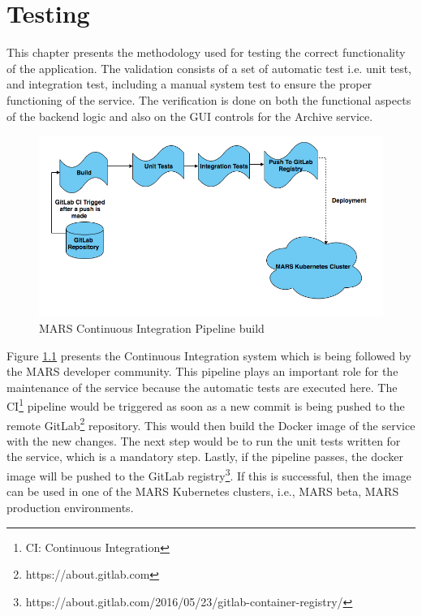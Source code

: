 \chapter{Testing}
\label{chap:testing}
This chapter presents the methodology used for testing the correct functionality of the application. The validation consists of a set of automatic test i.e.
unit test, and integration test, including a manual system test to ensure the proper functioning of the service. The verification is done on both the functional
aspects of the backend logic and also on the GUI controls for the Archive service.

\begin{figure}[H]
    \centering \includegraphics[scale=0.5]{grafiken/CIbuild.png}
    \caption{MARS Continuous Integration Pipeline build}
    \label{fig:CIbuild}
\end{figure}

Figure \ref{fig:CIbuild} presents the Continuous Integration system which is being followed by the MARS developer community. This pipeline plays an important role
for the maintenance of the service because the automatic tests are executed here.
The CI\footnote{CI: Continuous Integration} pipeline would be triggered as soon as a new commit is being pushed to the remote 
GitLab\footnote{https://about.gitlab.com} repository. This would then build the Docker image of the service with the new changes. The next step would be to
run the unit tests written for the service, which is a mandatory step. Lastly, if the pipeline passes, the docker image will be pushed
to the GitLab registry\footnote{https://about.gitlab.com/2016/05/23/gitlab-container-registry/}. If this is successful, then the image can be used in one of 
the MARS Kubernetes clusters, i.e., MARS beta, MARS production environments. 




